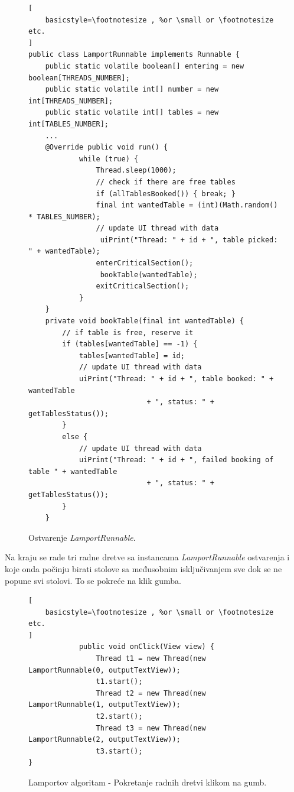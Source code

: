 \documentclass[times, utf8, zavrsni]{fer}
\begin{document}
\begin{figure}[ht!]
\begin{lstlisting}[
    basicstyle=\footnotesize , %or \small or \footnotesize etc.
]
public class LamportRunnable implements Runnable {
    public static volatile boolean[] entering = new boolean[THREADS_NUMBER];
    public static volatile int[] number = new int[THREADS_NUMBER];
    public static volatile int[] tables = new int[TABLES_NUMBER];
	...
    @Override public void run() {
            while (true) {
                Thread.sleep(1000);
                // check if there are free tables
                if (allTablesBooked()) { break; }
                final int wantedTable = (int)(Math.random() * TABLES_NUMBER);
                // update UI thread with data
                 uiPrint("Thread: " + id + ", table picked: " + wantedTable);                
                enterCriticalSection();
                 bookTable(wantedTable);
                exitCriticalSection();
            }
    }
    private void bookTable(final int wantedTable) {
        // if table is free, reserve it
        if (tables[wantedTable] == -1) {
            tables[wantedTable] = id;
            // update UI thread with data
            uiPrint("Thread: " + id + ", table booked: " + wantedTable
                            + ", status: " + getTablesStatus());
        }
        else {
            // update UI thread with data
            uiPrint("Thread: " + id + ", failed booking of table " + wantedTable
                            + ", status: " + getTablesStatus());
        }
	}
\end{lstlisting}
\caption{Ostvarenje \textit{LamportRunnable}.}
\label{overflow}
\end{figure}
\newpage

Na kraju se rade tri radne dretve sa instancama \textit{LamportRunnable} ostvarenja i koje onda počinju birati stolove sa međusobnim isključivanjem sve dok se ne popune svi stolovi. To se pokreće na klik gumba.

\begin{figure}[ht!]
\begin{lstlisting}[
    basicstyle=\footnotesize , %or \small or \footnotesize etc.
]
			public void onClick(View view) {
                Thread t1 = new Thread(new LamportRunnable(0, outputTextView));
                t1.start();
                Thread t2 = new Thread(new LamportRunnable(1, outputTextView));
                t2.start();
                Thread t3 = new Thread(new LamportRunnable(2, outputTextView));
                t3.start();
}
\end{lstlisting}
\caption{Lamportov algoritam - Pokretanje radnih dretvi klikom na gumb.}
\label{overflow}
\end{figure}
\end{document}

